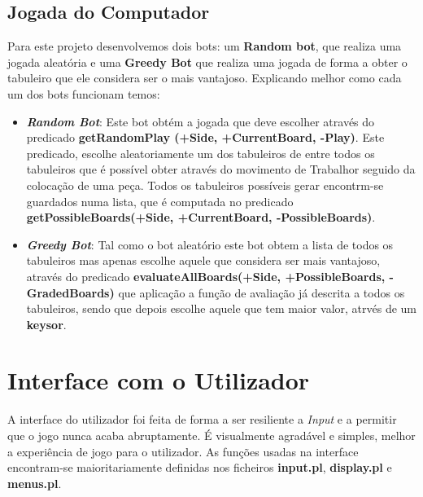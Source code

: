 \documentclass[a4paper]{article}
\begin{document}
\newpage

\subsection{Jogada do Computador}
Para este projeto desenvolvemos dois bots:  um \textbf {Random bot}, que realiza uma jogada aleatória e uma \textbf{Greedy Bot} que realiza uma jogada de forma a obter o tabuleiro que ele considera ser o mais vantajoso. Explicando melhor como cada um dos bots funcionam temos:
\begin{itemize}
 	\item \textbf{\textit{Random Bot}}: Este bot obtém a jogada que deve escolher através do predicado \textbf{getRandomPlay (+Side, +CurrentBoard, -Play)}. Este predicado, escolhe aleatoriamente um dos tabuleiros de entre todos os tabuleiros que é possível obter através do movimento de Trabalhor seguido da colocação de uma peça. Todos os tabuleiros possíveis gerar encontrm-se guardados numa lista, que é computada no predicado \textbf{getPossibleBoards(+Side, +CurrentBoard, -PossibleBoards)}.
	\item\textbf{\textit{Greedy Bot}}: Tal como o bot aleatório este bot obtem a lista de todos os tabuleiros mas apenas escolhe aquele que considera ser mais vantajoso, através do predicado \textbf{evaluateAllBoards(+Side, +PossibleBoards, -GradedBoards)} que aplicação a função de avaliação já descrita a todos os tabuleiros, sendo que depois escolhe aquele que tem maior valor, atrvés de um \textbf{keysor}.
\end{itemize}

\newpage

\section{Interface com o Utilizador}

A interface do utilizador foi feita de forma a ser resiliente a \textit{Input} e a permitir que o jogo nunca acaba abruptamente. É visualmente agradável e simples, melhor a experiência de jogo para o utilizador. As funções usadas na interface encontram-se maioritariamente definidas nos ficheiros \textbf{input.pl}, \textbf{display.pl} e \textbf{menus.pl}.
\end{document}
